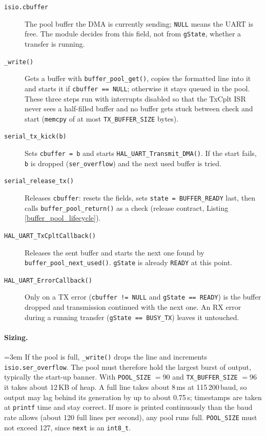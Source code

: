 \begin{description}
\item[\texttt{isio.cbuffer}] The pool buffer the DMA is currently sending;
  \verb|NULL| means the UART is free. The module decides from this field, not
  from \verb|gState|, whether a transfer is running.
\item[\texttt{\_write()}] Gets a buffer with \verb|buffer_pool_get()|, copies
  the formatted line into it and starts it if \verb|cbuffer == NULL|;
  otherwise it stays queued in the pool. These three steps run with interrupts
  disabled so that the TxCplt ISR never sees a half-filled buffer and no
  buffer gets stuck between check and start (\verb|memcpy| of at most
  \verb|TX_BUFFER_SIZE| bytes).
\item[\texttt{serial\_tx\_kick(b)}] Sets \verb|cbuffer = b| and starts
  \verb|HAL_UART_Transmit_DMA()|. If the start fails, \verb|b| is dropped
  (\verb|ser_overflow|) and the next used buffer is tried.
\item[\texttt{serial\_release\_tx()}] Releases \verb|cbuffer|: resets the
  fields, sets \verb|state = BUFFER_READY| last, then calls
  \verb|buffer_pool_return()| as a check (release contract, Listing
  \ref{buffer_pool_lifecycle}).
\item[\texttt{HAL\_UART\_TxCpltCallback()}] Releases the sent buffer and
  starts the next one found by \verb|buffer_pool_next_used()|. \verb|gState|
  is already \verb|READY| at this point.
\item[\texttt{HAL\_UART\_ErrorCallback()}] Only on a TX error
  (\verb|cbuffer != NULL| and \verb|gState == READY|) is the buffer dropped
  and transmission continued with the next one. An RX error during a running
  transfer (\verb|gState == BUSY_TX|) leaves it untouched.
\end{description}

\paragraph{Sizing.}
{\sloppy\emergencystretch=3em
If the pool is full, \verb|_write()| drops the line and increments
\verb|isio.ser_overflow|. The pool must therefore hold the largest burst of
output, typically the start-up banner. With \verb|POOL_SIZE| $= 90$ and
\verb|TX_BUFFER_SIZE| $= 96$ it takes about 12\,KB of heap. A full line takes
about 8\,ms at 115\,200\,baud, so output may lag behind its generation by up
to about 0.75\,s; timestamps are taken at \verb|printf| time and stay correct.
If more is printed continuously than the baud rate allows (about 120 full
lines per second), any pool runs full. \verb|POOL_SIZE| must not exceed 127,
since \verb|next| is an \verb|int8_t|.
\par}

